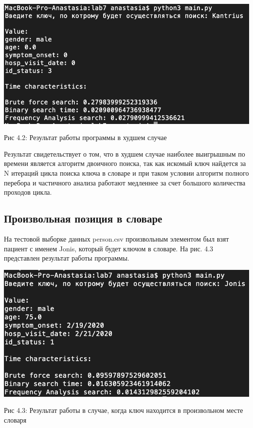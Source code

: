\documentclass[12pt]{report}
\begin{document}
\begin{center}
		\includegraphics[scale=0.7]{pics/Worst.png}
		
			Рис 4.2: Результат работы программы в худшем случае
\end{center}

Результат свидетельствует о том, что в худшем случае наиболее выигрышным по времени является алгоритм двоичного поиска, так как искомый ключ найдется за N итераций цикла поиска ключа в словаре и при таком условии алгоритм полного перебора и частичного анализа работают медленнее за счет большого количества проходов цикла.

\subsection{Произвольная позиция в словаре}

На тестовой выборке данных person.csv произвольным элементом был взят пациент с именем Jonis, который будет ключом в словаре. На рис. 4.3 представлен результат работы программы.

\begin{center}
		\includegraphics[scale=0.7]{pics/Random}
		
			Рис 4.3: Результат работы в случае, когда ключ находится в произвольном месте словаря
\end{center}
\end{document}
